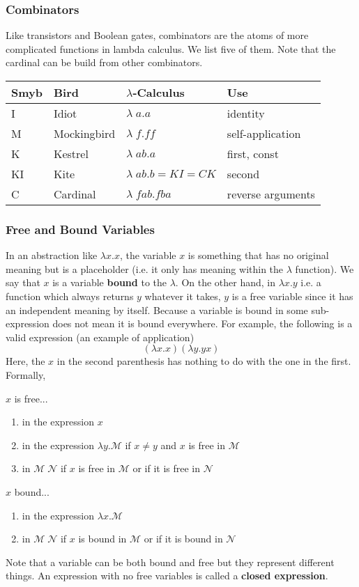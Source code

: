   \subsubsection{Combinators}
  Like transistors and Boolean gates, combinators are the atoms of more complicated functions in lambda calculus. We list five of them. Note that the cardinal can be build from other combinators. 
  \begin{center}
      \begin{tabular}{l|l|l|l}
      Smyb & Bird & $\lambda$-Calculus & Use \\
      \hline
      I & Idiot & $\lambda\;a.a$ & identity \\
      M & Mockingbird & $\lambda\;f.ff$ & self-application \\
      K & Kestrel & $\lambda\;ab.a $ & first, const \\
      KI & Kite & $\lambda\;ab.b = KI = CK$ & second \\
      C & Cardinal & $\lambda\;fab.fba$ & reverse arguments
  \end{tabular}
  \end{center}


  \subsubsection{Free and Bound Variables}
  In an abstraction like $\lambda x . x$, the variable $x$ is something that has no original meaning but is a placeholder (i.e. it only has meaning within the $\lambda$ function). We say that $x$ is a variable \textbf{bound} to the $\lambda$. On the other hand, in $\lambda x . y$ i.e. a function which always returns $y$ whatever it takes, $y$ is a free variable since it has an independent meaning by itself. Because a variable is bound in some sub-expression does not mean it is bound everywhere. For example, the following is a valid expression (an example of application)
  \[(\lambda x . x) ( \lambda y. y x)\]
  Here, the $x$ in the second parenthesis has nothing to do with the one in the first. Formally, 

  \begin{definition}
  $x$ is free...
  \begin{enumerate}
      \item in the expression $x$
      \item in the expression $\lambda y. \mathcal{M}$ if $x \neq y $ and $x$ is free in $\mathcal{M}$ 
      \item in $\mathcal{M}\; \mathcal{N}$ if $x$ is free in $\mathcal{M}$ or if it is free in $\mathcal{N}$ 
  \end{enumerate}
  $x$ bound...
  \begin{enumerate}
      \item in the expression $\lambda x. \mathcal{M}$
      \item in $\mathcal{M} \; \mathcal{N}$ if $x$ is bound in $\mathcal{M}$ or if it is bound in $\mathcal{N}$
  \end{enumerate}
  \end{definition}
  Note that a variable can be both bound and free but they represent different things. An expression with no free variables is called a \textbf{closed expression}. 

